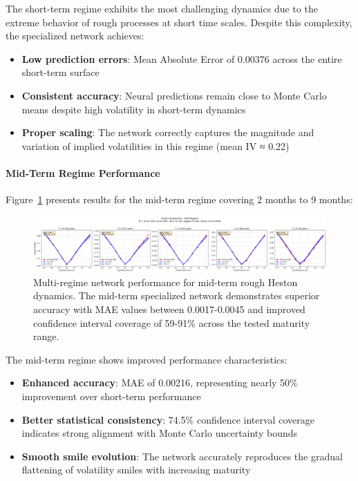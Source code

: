 	The short-term regime exhibits the most challenging dynamics due to the extreme behavior of rough processes at short time scales. Despite this complexity, the specialized network achieves:
	
	\begin{itemize}[nosep]
		\item \textbf{Low prediction errors}: Mean Absolute Error of 0.00376 across the entire short-term surface
		\item \textbf{Consistent accuracy}: Neural predictions remain close to Monte Carlo means despite high volatility in short-term dynamics
		\item \textbf{Proper scaling}: The network correctly captures the magnitude and variation of implied volatilities in this regime (mean IV ≈ 0.22)
	\end{itemize}
	
	\paragraph{Mid-Term Regime Performance}
	
	Figure~\ref{fig:multiregime-mid} presents results for the mid-term regime covering 2 months to 9 months:
	
	\begin{figure}[ht]
		\centering
		\includegraphics[width=\textwidth]{../images/smile_comparison_mid_regime.png}
		\caption{Multi-regime network performance for mid-term rough Heston dynamics. The mid-term specialized network demonstrates superior accuracy with MAE values between 0.0017-0.0045 and improved confidence interval coverage of 59-91\% across the tested maturity range.}
		\label{fig:multiregime-mid}
	\end{figure}
	
	The mid-term regime shows improved performance characteristics:
	
	\begin{itemize}[nosep]
		\item \textbf{Enhanced accuracy}: MAE of 0.00216, representing nearly 50\% improvement over short-term performance
		\item \textbf{Better statistical consistency}: 74.5\% confidence interval coverage indicates strong alignment with Monte Carlo uncertainty bounds
		\item \textbf{Smooth smile evolution}: The network accurately reproduces the gradual flattening of volatility smiles with increasing maturity
	\end{itemize}
			
